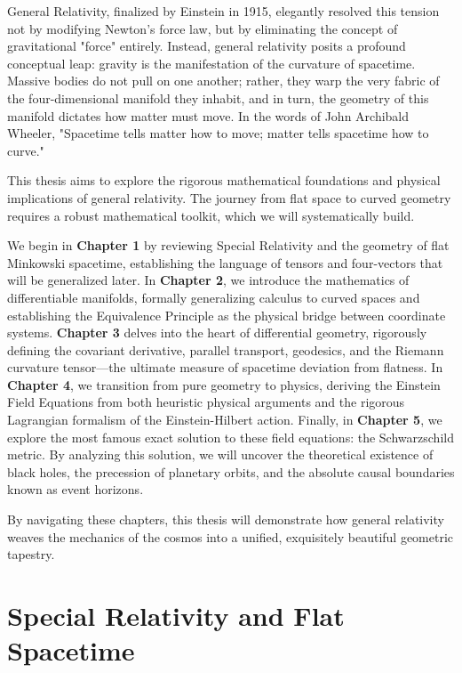\documentclass[11pt, a4paper]{report}
\begin{document}
General Relativity, finalized by Einstein in 1915, elegantly resolved this tension not by modifying Newton's force law, but by eliminating the concept of gravitational "force" entirely. Instead, general relativity posits a profound conceptual leap: gravity is the manifestation of the curvature of spacetime. Massive bodies do not pull on one another; rather, they warp the very fabric of the four-dimensional manifold they inhabit, and in turn, the geometry of this manifold dictates how matter must move. In the words of John Archibald Wheeler, "Spacetime tells matter how to move; matter tells spacetime how to curve."
\newline

This thesis aims to explore the rigorous mathematical foundations and physical implications of general relativity. The journey from flat space to curved geometry requires a robust mathematical toolkit, which we will systematically build. 
\newline

We begin in \textbf{Chapter 1} by reviewing Special Relativity and the geometry of flat Minkowski spacetime, establishing the language of tensors and four-vectors that will be generalized later. 
In \textbf{Chapter 2}, we introduce the mathematics of differentiable manifolds, formally generalizing calculus to curved spaces and establishing the Equivalence Principle as the physical bridge between coordinate systems. 
\textbf{Chapter 3} delves into the heart of differential geometry, rigorously defining the covariant derivative, parallel transport, geodesics, and the Riemann curvature tensor—the ultimate measure of spacetime deviation from flatness.
In \textbf{Chapter 4}, we transition from pure geometry to physics, deriving the Einstein Field Equations from both heuristic physical arguments and the rigorous Lagrangian formalism of the Einstein-Hilbert action.
Finally, in \textbf{Chapter 5}, we explore the most famous exact solution to these field equations: the Schwarzschild metric. By analyzing this solution, we will uncover the theoretical existence of black holes, the precession of planetary orbits, and the absolute causal boundaries known as event horizons.
\newline

By navigating these chapters, this thesis will demonstrate how general relativity weaves the mechanics of the cosmos into a unified, exquisitely beautiful geometric tapestry.



\chapter{Special Relativity and Flat Spacetime}
\end{document}
